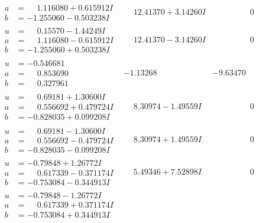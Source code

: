\documentclass[1p]{elsarticle_modified}
\theoremstyle{definition}
\begin{document}
$$\begin{array}{c|c|c}
\begin{aligned}
a &= \phantom{-}1.116080 + 0.615912 I \\
b &= -1.255060 - 0.503238 I\end{aligned}
 & \phantom{-}12.41370 + 3.14260 I & \phantom{-0.000000 } 0 \\ \hline\begin{aligned}
u &= \phantom{-}0.15570 - 1.44249 I \\
a &= \phantom{-}1.116080 - 0.615912 I \\
b &= -1.255060 + 0.503238 I\end{aligned}
 & \phantom{-}12.41370 - 3.14260 I & \phantom{-0.000000 } 0 \\ \hline\begin{aligned}
u &= -0.546681\phantom{ +0.000000I} \\
a &= \phantom{-}0.853690\phantom{ +0.000000I} \\
b &= \phantom{-}0.327961\phantom{ +0.000000I}\end{aligned}
 & -1.13268\phantom{ +0.000000I} & -9.63470\phantom{ +0.000000I} \\ \hline\begin{aligned}
u &= \phantom{-}0.69181 + 1.30600 I \\
a &= \phantom{-}0.556692 + 0.479724 I \\
b &= -0.828035 + 0.099208 I\end{aligned}
 & \phantom{-}8.30974 - 1.49559 I & \phantom{-0.000000 } 0 \\ \hline\begin{aligned}
u &= \phantom{-}0.69181 - 1.30600 I \\
a &= \phantom{-}0.556692 - 0.479724 I \\
b &= -0.828035 - 0.099208 I\end{aligned}
 & \phantom{-}8.30974 + 1.49559 I & \phantom{-0.000000 } 0 \\ \hline\begin{aligned}
u &= -0.79848 + 1.26772 I \\
a &= \phantom{-}0.617339 - 0.371174 I \\
b &= -0.753084 - 0.344913 I\end{aligned}
 & \phantom{-}5.49346 + 7.52898 I & \phantom{-0.000000 } 0 \\ \hline\begin{aligned}
u &= -0.79848 - 1.26772 I \\
a &= \phantom{-}0.617339 + 0.371174 I \\
b &= -0.753084 + 0.344913 I\end{aligned}

\end{array}$$
\end{document}
